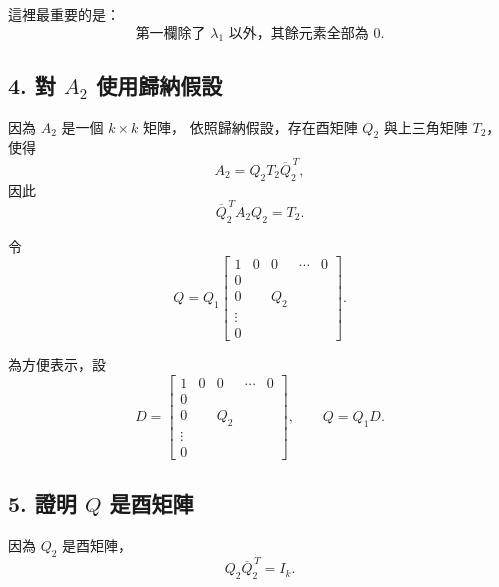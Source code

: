 \documentclass[12pt,a4paper]{article}
\begin{document}
這裡最重要的是：
\[
    \boxed{\text{第一欄除了 }\lambda_1\text{ 以外，其餘元素全部為 }0.}
\]

\subsection*{4. 對 $A_2$ 使用歸納假設}

因為 $A_2$ 是一個 $k\times k$ 矩陣，
依照歸納假設，存在酉矩陣 $Q_2$ 與上三角矩陣 $T_2$，使得
\[
    A_2=Q_2T_2\overline{Q}_2^{\,T},
\]
因此
\[
    \overline{Q}_2^{\,T}A_2Q_2=T_2.
\]

令
\[
    Q
    =
    Q_1
    \left[
        \begin{array}{ccccc}
            1      & 0 & 0   & \cdots & 0 \\[4pt]
            0      &   &     &        &   \\[-3pt]
            0      &   & Q_2 &        &   \\[-3pt]
            \vdots &   &     &        &   \\[-3pt]
            0      &   &     &        &
        \end{array}
        \right].
\]

為方便表示，設
\[
    D=
    \left[
        \begin{array}{ccccc}
            1      & 0 & 0   & \cdots & 0 \\[4pt]
            0      &   &     &        &   \\[-3pt]
            0      &   & Q_2 &        &   \\[-3pt]
            \vdots &   &     &        &   \\[-3pt]
            0      &   &     &        &
        \end{array}
        \right],
    \qquad
    Q=Q_1D.
\]

\subsection*{5. 證明 $Q$ 是酉矩陣}

因為 $Q_2$ 是酉矩陣，
\[
    Q_2\overline{Q}_2^{\,T}=I_k.
\]
\end{document}
